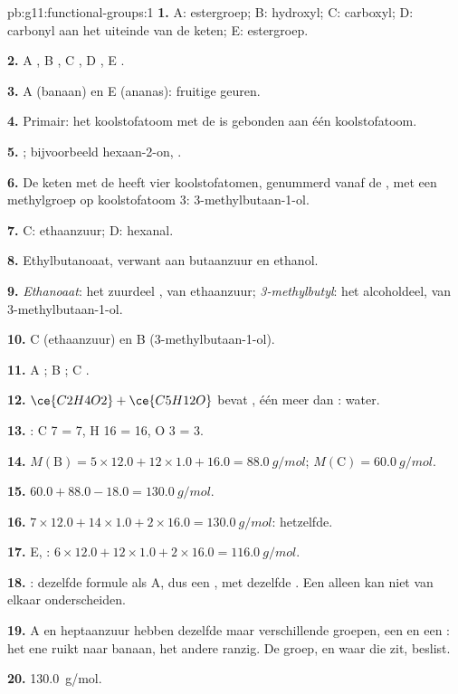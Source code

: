 \begin{solution}{pb:g11:functional-groups:1}
\textbf{1.} A: estergroep; B: hydroxyl; C: carboxyl; D: carbonyl aan het
uiteinde van de keten; E: estergroep.

\textbf{2.} A , B , C , D , E .

\textbf{3.} A (banaan) en E (ananas): fruitige geuren.

\textbf{4.} Primair: het koolstofatoom met de  is gebonden aan
één koolstofatoom.

\textbf{5.} ; bijvoorbeeld hexaan-2-on,
.

\textbf{6.} De keten met de  heeft vier koolstofatomen,
genummerd vanaf de , met een methylgroep op koolstofatoom 3:
3-methylbutaan-1-ol.

\textbf{7.} C: ethaanzuur; D: hexanal.

\textbf{8.} Ethylbutanoaat, verwant aan butaanzuur en ethanol.

\textbf{9.} \emph{Ethanoaat}: het zuurdeel , van ethaanzuur;
\emph{3-methylbutyl}: het alcoholdeel, van 3-methylbutaan-1-ol.

\textbf{10.} C (ethaanzuur) en B (3-methylbutaan-1-ol).

\textbf{11.} A ; B ; C .

\textbf{12.} $\ce{C2H4O2} + \ce{C5H12O}$ bevat , één 
meer dan : water.

\textbf{13.} : C 7 = 7, H 16 = 16,
O 3 = 3.

\textbf{14.} $M(\text{B}) = 5 \times 12.0 + 12 \times 1.0 + 16.0 =
\qty{88.0}{g/mol}$; $M(\text{C}) = \qty{60.0}{g/mol}$.

\textbf{15.} $60.0 + 88.0 - 18.0 = \qty{130.0}{g/mol}$.

\textbf{16.} $7 \times 12.0 + 14 \times 1.0 + 2 \times 16.0 =
\qty{130.0}{g/mol}$: hetzelfde.

\textbf{17.} E, : $6 \times 12.0 + 12 \times 1.0 + 2 \times
16.0 = \qty{116.0}{g/mol}$.

\textbf{18.} : dezelfde formule als A, dus een , met
dezelfde . Een  alleen kan  niet van
elkaar onderscheiden.

\textbf{19.} A en heptaanzuur hebben dezelfde  maar verschillende
groepen, een  en een : het ene ruikt naar banaan, het
andere ranzig. De groep, en waar die zit, beslist.

\textbf{20.} \qty{130.0}{g/mol}.
\end{solution}

